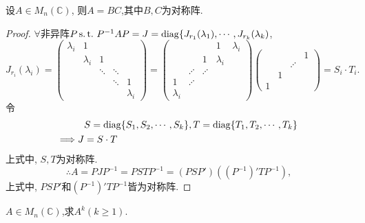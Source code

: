 \begin{example}
  设$A \in M_n(\mathbb{C})$,
  则$A=BC$,其中$B,C$为对称阵.
\end{example}

\begin{proof}
  $\forall$非异阵$P \operatorname{s.t.{}} P^{-1}AP=J=
  \operatorname{diag}\{J_{r_1}(\lambda_1),\cdots,J_{r_k}(\lambda_k)$,
  \[ J_{r_i}(\lambda_i)=
    \begin{pmatrix}
      \lambda_i&1&&&\\
               &\lambda_i&1&&\\
               &&\ddots&\ddots&\\
               &&&\ddots&1\\
      &&&&\lambda_i
    \end{pmatrix}=
    \begin{pmatrix}
      &&&1&\lambda_i\\
      &&1&\lambda_i&\\
      &\iddots&\iddots&&\\
      1&\iddots&&&\\
      \lambda_i&&&&
    \end{pmatrix}
    \begin{pmatrix}
      &&&1\\
      &&\iddots&\\
      &1&&\\
      1&&&
    \end{pmatrix}=S_i\cdot T_i. \]
  令
  \begin{align*}
    & S=\operatorname{diag}\{S_1,S_2,\cdots,S_k\}, 
      T=\operatorname{diag}\{T_1,T_2,\cdots,T_k\}\\
    \Longrightarrow J & =S\cdot T
  \end{align*}
  上式中, $S, T$为对称阵.
  \[ \therefore A=PJP^{-1}=PSTP^{-1}=(PSP')((P^{-1})'TP^{-1}), \]
  上式中, $PSP'$和$(P^{-1})'TP^{-1}$皆为对称阵.
\end{proof}

\begin{example}
  $A \in M_n(\mathbb{C})$,求$A^{k}(k \geq 1)$.
\end{example}

